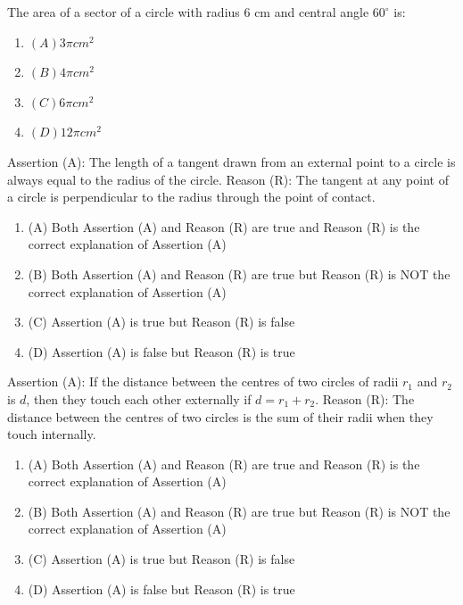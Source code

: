 \documentclass[12pt,a4paper]{exam}
\begin{document}
\begin{questions}
\question[1] The area of a sector of a circle with radius $6\text{ cm}$ and central angle $60^\circ$ is:
\begin{enumerate}[label=(\Alph*)]
  \item $(A) 3\pi cm^{2}$
  \item $(B) 4\pi cm^{2}$
  \item $(C) 6\pi cm^{2}$
  \item $(D) 12\pi cm^{2}$
\end{enumerate}
\vspace{0.15cm}

\question[1] Assertion (A): The length of a tangent drawn from an external point to a circle is always equal to the radius of the circle.
Reason (R): The tangent at any point of a circle is perpendicular to the radius through the point of contact.
\begin{enumerate}[label=(\Alph*)]
  \item (A) Both Assertion (A) and Reason (R) are true and Reason (R) is the correct explanation of Assertion (A)
  \item (B) Both Assertion (A) and Reason (R) are true but Reason (R) is NOT the correct explanation of Assertion (A)
  \item (C) Assertion (A) is true but Reason (R) is false
  \item (D) Assertion (A) is false but Reason (R) is true
\end{enumerate}
\vspace{0.15cm}

\question[1] Assertion (A): If the distance between the centres of two circles of radii $r_1$ and $r_2$ is $d$, then they touch each other externally if $d = r_1 + r_2$.
Reason (R): The distance between the centres of two circles is the sum of their radii when they touch internally.
\begin{enumerate}[label=(\Alph*)]
  \item (A) Both Assertion (A) and Reason (R) are true and Reason (R) is the correct explanation of Assertion (A)
  \item (B) Both Assertion (A) and Reason (R) are true but Reason (R) is NOT the correct explanation of Assertion (A)
  \item (C) Assertion (A) is true but Reason (R) is false
  \item (D) Assertion (A) is false but Reason (R) is true
\end{enumerate}
\vspace{0.15cm}


\end{questions}
\end{document}
